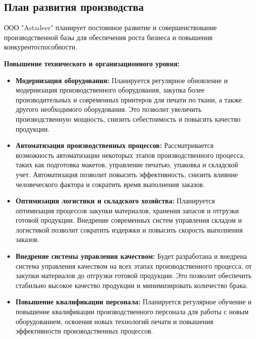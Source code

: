 \subsection{План развития производства}

ООО "Astadeer" планирует постоянное развитие и совершенствование производственной базы для обеспечения роста бизнеса и повышения конкурентоспособности.

\vspace{0.3cm}

\textbf{Повышение технического и организационного уровня:}

\begin{itemize}
    \item \textbf{Модернизация оборудования:}  Планируется регулярное обновление и модернизация производственного оборудования, закупка более производительных и современных принтеров для печати по ткани, а также другого необходимого оборудования.  Это позволит увеличить производственную мощность, снизить себестоимость и повысить качество продукции.
    \item \textbf{Автоматизация производственных процессов:}  Рассматривается возможность автоматизации некоторых этапов производственного процесса, таких как подготовка макетов, управление печатью, упаковка и складской учет.  Автоматизация позволит повысить эффективность, снизить влияние человеческого фактора и сократить время выполнения заказов.
    \item \textbf{Оптимизация логистики и складского хозяйства:}  Планируется оптимизация процессов закупки материалов, хранения запасов и отгрузки готовой продукции.  Внедрение современных систем управления складом и логистикой позволит сократить издержки и повысить скорость выполнения заказов.
    \item \textbf{Внедрение системы управления качеством:}  Будет разработана и внедрена система управления качеством на всех этапах производственного процесса, от закупки материалов до отгрузки готовой продукции.  Это позволит обеспечить стабильно высокое качество продукции и минимизировать количество брака.
    \item \textbf{Повышение квалификации персонала:}  Планируется регулярное обучение и повышение квалификации производственного персонала для работы с новым оборудованием, освоения новых технологий печати и повышения эффективности производственных процессов.
\end{itemize}

\vspace{0.3cm}

